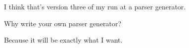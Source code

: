 

I think that's version three of my run at a parser generator.

Why write your own parser generator?

Because it will be exactly what I want.

\bye
